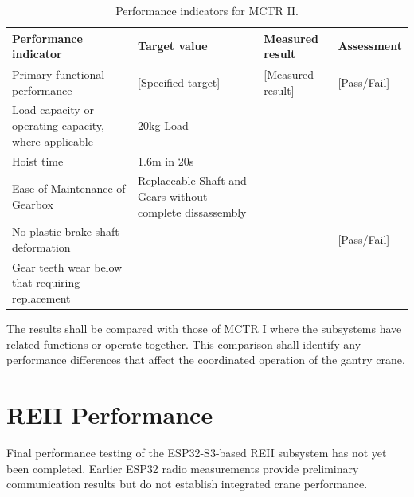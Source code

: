 \begin{table}[H]
    \centering
    \caption{Performance indicators for MCTR II.}
    \label{tab:mctr-ii-performance}
    \renewcommand{\arraystretch}{1.4}
 \begin{tabularx}{\textwidth}{|X|X|X|X|}
        \hline
        \textbf{Performance indicator} &
        \textbf{Target value} &
        \textbf{Measured result} &
        \textbf{Assessment} \\
        \hline
        Primary functional performance &
        [Specified target] &
        [Measured result] &
        [Pass/Fail] \\
        \hline
        Load capacity or operating capacity,
        where applicable &
        20kg Load &
        \tbd{} &
        \tbd{} \\
        \hline
        Hoist time &
        1.6m in 20s &
        \tbd{} &
        \tbd{} \\
        \hline
        Ease of Maintenance of Gearbox &
        Replaceable Shaft and Gears without complete dissassembly &
        \tbd{} &
        \tbd{} \\
        \hline
        No plastic brake shaft deformation &
        \tbd{} &
        \tbd{} &
        [Pass/Fail] \\
        \hline
        Gear teeth wear below that requiring replacement &
       \tbd{} &
        \tbd{} &
        \tbd{} \\
        \hline
    \end{tabularx}
\end{table}

The results shall be compared with those of MCTR I where the
subsystems have related functions or operate together. This
comparison shall identify any performance differences that affect
the coordinated operation of the gantry crane.

\section{REII Performance}
\label{sec:reii-performance}

Final performance testing of the ESP32-S3-based REII
subsystem has not yet been completed. Earlier ESP32
radio measurements provide preliminary communication
results but do not establish integrated crane performance.
\cite{reii_measurements2026}

